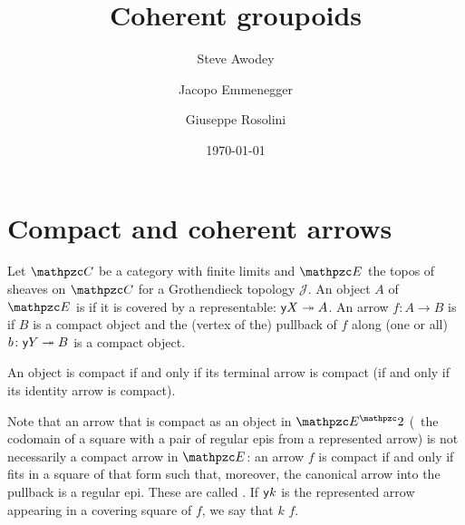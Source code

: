 \documentclass[a4paper,11pt]{amsart}
\title{Coherent groupoids}
\author{Steve Awodey}
\author{Jacopo Emmenegger}
\author{Giuseppe Rosolini}
\date{\today}
\newcommand{\covers}{\twoheadrightarrow}
\begin{document}
	\maketitle


\section{Compact and coherent arrows}
\label{sec:comp-coh}

Let $\Ccat$ be a category with finite limits and $\Ecat$ the topos of sheaves on $\Ccat$ for a Grothendieck topology $\mathcal{J}$.
An object $A$ of $\Ecat$ is  if it is covered by a representable:
$\yo X \covers A$.
An arrow $f\colon A\to B$ is  if $B$ is a compact object
and the (vertex of the) pullback of $f$ along (one or all) $b\colon \yo Y \covers B$ is a compact object.

An object is compact
if and only if its terminal arrow is compact
(if and only if its identity arrow is compact).

Note that an arrow that is compact as an object in $\Ecat^\arrcat$
(\ie~the codomain of a square with a pair of regular epis from a represented arrow)
is not necessarily a compact arrow in $\Ecat$:
an arrow $f$ is compact if and only if fits in a square of that form such that, moreover, the canonical arrow into the pullback is a regular epi.
These are called .
If $\mathsf{y} k$ is the represented arrow appearing in a covering square of $f$, we say that $k$  $f$.

\end{document}
